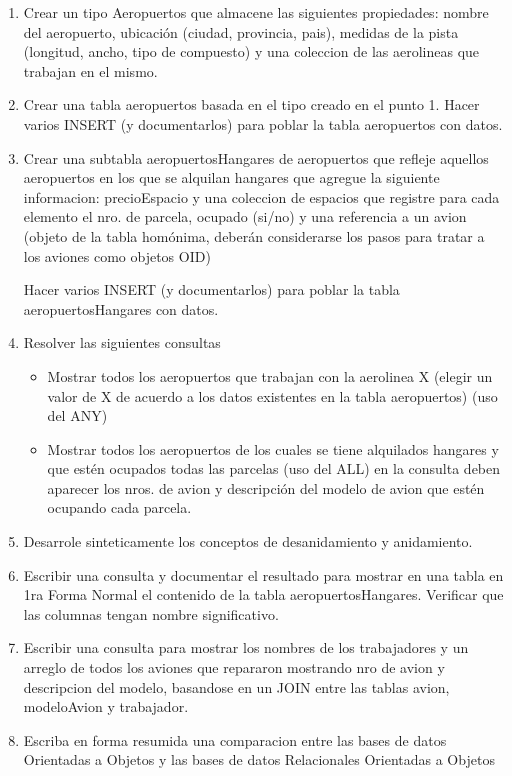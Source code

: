 \documentclass[12pt]{report}
\begin{document}
\begin{enumerate}
    \item Crear un tipo Aeropuertos que almacene las siguientes propiedades: nombre del aeropuerto, ubicación (ciudad, provincia, pais), medidas de la pista (longitud, ancho, tipo de compuesto) y una coleccion de las aerolineas que trabajan en el mismo.
    \item Crear una tabla aeropuertos basada en el tipo creado en el punto 1. Hacer varios INSERT (y documentarlos) para poblar la tabla aeropuertos con datos.
    \item Crear una subtabla aeropuertosHangares de aeropuertos que refleje aquellos aeropuertos en los que se alquilan hangares que agregue la siguiente informacion: precioEspacio y una coleccion de espacios que registre para cada elemento el nro. de parcela, ocupado (si/no) y una referencia a un avion (objeto de la tabla homónima, deberán considerarse los pasos para tratar a los aviones como objetos OID)

Hacer varios INSERT (y documentarlos) para poblar la tabla aeropuertosHangares con datos.
    \item Resolver las siguientes consultas
        \begin{itemize}
            \item Mostrar todos los aeropuertos que trabajan con la aerolinea X (elegir un valor de X de acuerdo a los datos existentes en la tabla aeropuertos) (uso del ANY)
            \item Mostrar todos los aeropuertos de los cuales se tiene alquilados hangares y que estén ocupados todas las parcelas (uso del ALL) en la consulta deben aparecer los nros. de avion y descripción del modelo de avion que estén ocupando cada parcela.
        \end{itemize}
    \item Desarrole sinteticamente los conceptos de desanidamiento y anidamiento.
    \item Escribir una consulta y documentar el resultado para mostrar en una tabla en 1ra Forma Normal el contenido de la tabla aeropuertosHangares. Verificar que las columnas tengan nombre significativo.
    \item Escribir una consulta para mostrar los nombres de los trabajadores y un arreglo de todos los aviones que repararon mostrando nro de avion y descripcion del modelo, basandose en un JOIN entre las tablas avion, modeloAvion y trabajador.
    \item Escriba en forma resumida una comparacion entre las bases de datos Orientadas a Objetos y las bases de datos Relacionales Orientadas a Objetos
\end{enumerate}

\newpage

\end{document}
